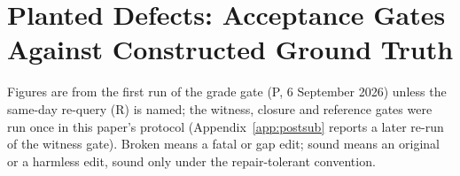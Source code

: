 \begin{table}[htbp]\centering\scriptsize\setlength{\tabcolsep}{3pt}
\caption{Every objection on the seven disputed texts: ledger statement(s) named, each checker's status as written, and repair distances.}
\label{tab:refadj-disputes}
\resizebox{\textwidth}{!}{\REFADJDISPUTETABLE}
\end{table}

\begin{table}[htbp]\centering\footnotesize
\caption{Reference-anchored outcome per text and scored obligation under the as-written (AW) and repair-tolerant (RT) conventions: $\times$ not established by consensus, ? unresolved (split), m mixed, \checkmark established by consensus, -- no objection; $D$ = obligations failed; ledger-guided ratings $S_{\mathrm{ref}}$ by GPT / Claude / GLM; v6 $S_{\mathrm{valid}}$ and grades.}
\label{tab:refadj}
\REFADJTABLE
\end{table}

\clearpage
\section{Planted Defects: Acceptance Gates Against Constructed Ground Truth}
\label{app:planted}
Figures are from the first run of the grade gate (P, 6 September 2026) unless the same-day re-query (R) is named; the witness, closure and reference gates were run once in this paper's protocol (Appendix~\ref{app:postsub} reports a later re-run of the witness gate). Broken means a fatal or gap edit; sound means an original or a harmless edit, sound only under the repair-tolerant convention.


